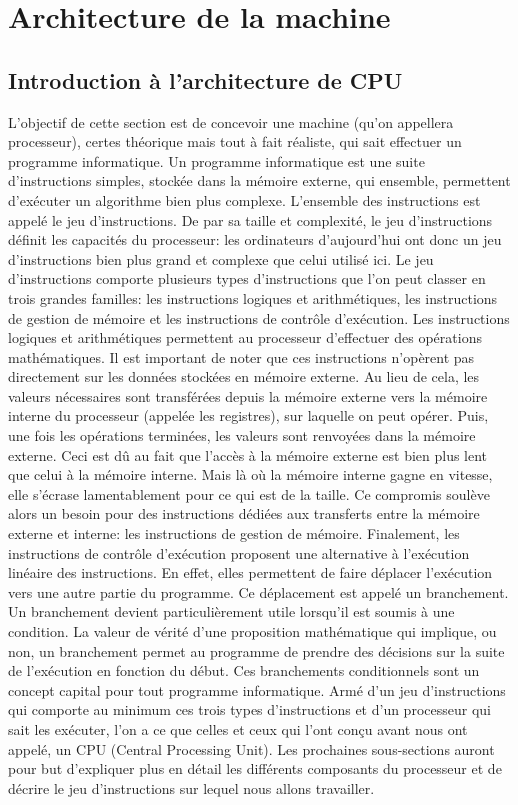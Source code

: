 \documentclass{article}
\begin{document}
\section{Architecture de la machine}
\subsection{Introduction à l'architecture de CPU}
L'objectif de cette section est de concevoir une machine (qu'on appellera processeur), certes théorique mais tout à fait réaliste, qui sait effectuer un programme informatique. Un programme informatique est une suite d'instructions simples, stockée dans la mémoire externe, qui ensemble, permettent d'exécuter un algorithme bien plus complexe. L'ensemble des instructions est appelé le jeu d'instructions. De par sa taille et complexité, le jeu d'instructions définit les capacités du processeur: les ordinateurs d'aujourd'hui ont donc un jeu d'instructions bien plus grand et complexe que celui utilisé ici. Le jeu d'instructions comporte plusieurs types d'instructions que l'on peut classer en trois grandes familles: les instructions logiques et arithmétiques, les instructions de gestion de mémoire et les instructions de contrôle d'exécution.
Les instructions logiques et arithmétiques permettent au processeur d'effectuer des opérations mathématiques. Il est important de noter que ces instructions n'opèrent pas directement sur les données stockées en mémoire externe. Au lieu de cela, les valeurs nécessaires sont transférées depuis la mémoire externe vers la mémoire interne du processeur (appelée les registres), sur laquelle on peut opérer. Puis, une fois les opérations terminées, les valeurs sont renvoyées dans la mémoire externe. Ceci est dû au fait que l'accès à la mémoire externe est bien plus lent que celui à la mémoire interne. Mais là où la mémoire interne gagne en vitesse, elle s'écrase lamentablement pour ce qui est de la taille. Ce compromis soulève alors un besoin pour des instructions dédiées aux transferts entre la mémoire externe et interne: les instructions de gestion de mémoire. Finalement, les instructions de contrôle d'exécution proposent une alternative à l'exécution linéaire des instructions. En effet, elles permettent de faire déplacer l'exécution vers une autre partie du programme. Ce déplacement est appelé un branchement. Un branchement devient particulièrement utile lorsqu'il est soumis à une condition. La valeur de vérité d'une proposition mathématique qui implique, ou non, un branchement permet au programme de prendre des décisions sur la suite de l'exécution en fonction du début. Ces branchements conditionnels sont un concept capital pour tout programme informatique. Armé d'un jeu d'instructions qui comporte au minimum ces trois types d'instructions et d'un processeur qui sait les exécuter, l'on a ce que celles et ceux qui l'ont conçu avant nous ont appelé, un CPU (Central Processing Unit). Les prochaines sous-sections auront pour but d'expliquer plus en détail les différents composants du processeur et de décrire le jeu d'instructions sur lequel nous allons travailler.
\pagebreak
\end{document}
